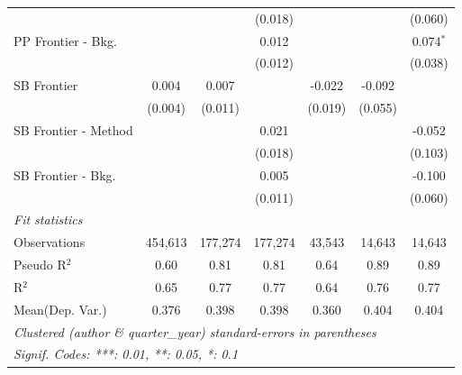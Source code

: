 \begin{tabular}{lcccccc}
                        &                &                & (0.018)        &                &                & (0.060)\\   
   PP Frontier - Bkg.   &                &                & 0.012          &                &                & 0.074$^{*}$\\   
                        &                &                & (0.012)        &                &                & (0.038)\\   
   SB Frontier          & 0.004          & 0.007          &                & -0.022         & -0.092         &   \\   
                        & (0.004)        & (0.011)        &                & (0.019)        & (0.055)        &   \\   
   SB Frontier - Method &                &                & 0.021          &                &                & -0.052\\   
                        &                &                & (0.018)        &                &                & (0.103)\\   
   SB Frontier - Bkg.   &                &                & 0.005          &                &                & -0.100\\   
                        &                &                & (0.011)        &                &                & (0.060)\\   
   \midrule
   \emph{Fit statistics}\\
   Observations         & 454,613        & 177,274        & 177,274        & 43,543         & 14,643         & 14,643\\  
   Pseudo R$^2$         & 0.60           & 0.81           & 0.81           & 0.64           & 0.89           & 0.89\\  
   R$^2$                & 0.65           & 0.77           & 0.77           & 0.64           & 0.76           & 0.77\\  
Mean(Dep. Var.) & 0.376 & 0.398 & 0.398 & 0.360 & 0.404 & 0.404 \\
   \midrule \midrule
   \multicolumn{7}{l}{\emph{Clustered (author \& quarter\_year) standard-errors in parentheses}}\\
   \multicolumn{7}{l}{\emph{Signif. Codes: ***: 0.01, **: 0.05, *: 0.1}}\\
\end{tabular}
\par\endgroup
